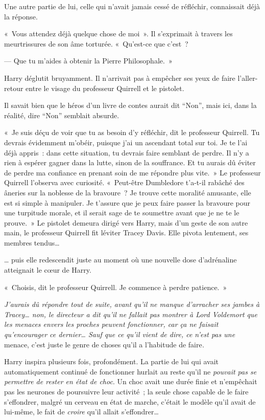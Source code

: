 Une autre partie de lui, celle qui n'avait jamais cessé de réfléchir, connaissait déjà la réponse.

«~Vous attendez déjà quelque chose de moi~».
Il s'exprimait à travers les meurtrissures de son âme torturée.
«~Qu'est-ce que c'est~?

--- Que tu m'aides à obtenir la Pierre Philosophale.~»

Harry déglutit bruyamment.
Il n'arrivait pas à empêcher ses yeux de faire l'aller-retour entre le visage du professeur Quirrell et le pistolet.

Il savait bien que le héros d'un livre de contes aurait dit “Non”, mais ici, dans la réalité, dire “Non” semblait absurde.

«~Je suis déçu de voir que tu as besoin d'y réfléchir, dit le professeur Quirrell.
Tu devrais évidemment m'obéir, puisque j'ai un ascendant total sur toi.
Je te l'ai déjà appris~: dans cette situation, tu devrais faire semblant de perdre.
Il n'y a rien à espérer gagner dans la lutte, sinon de la souffrance.
Et tu aurais dû éviter de perdre ma confiance en prenant soin de me répondre plus vite.~»
Le professeur Quirrell l'observa avec curiosité.
«~Peut-être Dumbledore t'a-t-il rabâché des âneries sur la noblesse de la bravoure~?
Je trouve cette moralité amusante, elle est si simple à manipuler.
Je t'assure que je peux faire passer la bravoure pour une turpitude morale, et il serait sage de te soumettre avant que je ne te le prouve.~»
Le pistolet demeura dirigé vers Harry, mais d'un geste de son autre main, le professeur Quirrell fit léviter Tracey Davis.
Elle pivota lentement, ses membres tendus…

… puis elle redescendit juste au moment où une nouvelle dose d'adrénaline atteignait le cœur de Harry.

«~Choisis, dit le professeur Quirrell.
Je commence à perdre patience.~»

\emph{J'aurais dû répondre tout de suite, avant qu'il ne manque d'arracher ses jambes à Tracey… non, le directeur a dit qu'il ne fallait pas montrer à Lord Voldemort que les menaces envers les proches peuvent fonctionner, car ça ne faisait qu'encourager ce dernier…
Sauf que ce qu'il vient de dire, ce n'est pas une} menace, c'est juste le genre de choses qu'il a l'habitude de faire\emph{.}

Harry inspira plusieurs fois, profondément.
La partie de lui qui avait automatiquement continué de fonctionner hurlait au reste qu'il ne \emph{pouvait pas se permettre de rester en état de choc}.
Un choc avait une durée finie et n'empêchait pas les neurones de poursuivre leur activité~; la seule chose capable de le faire s'effondrer, malgré un cerveau en état de marche, c'était le modèle qu'il avait de lui-même, le fait de \emph{croire} qu'il allait s'effondrer…

